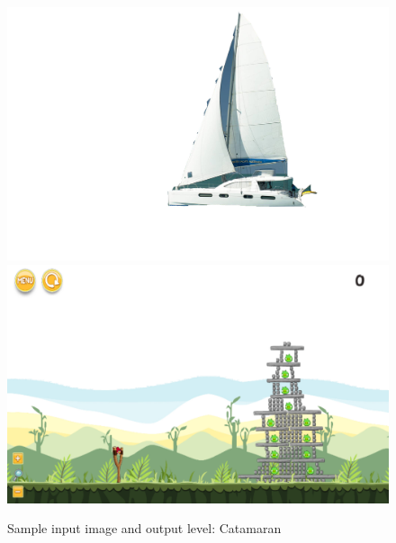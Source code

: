 \documentclass{dalthesis}
\begin{document}
\begin{figure}
	\caption{Sample input image and output level: Catamaran}
  \includegraphics[width=\textwidth,height=\textheight,keepaspectratio]{levels/pictures/ships/catamaran.jpg}
  \includegraphics[width=\textwidth,height=\textheight,keepaspectratio]{levels/screenshots/ships/catamaran.png}
\end{figure}
\end{document}
